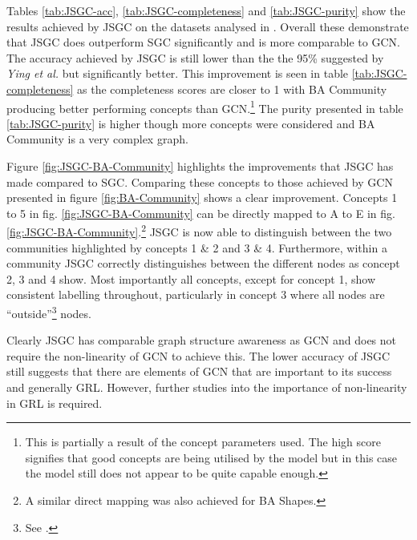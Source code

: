 Tables \ref{tab:JSGC-acc}, \ref{tab:JSGC-completeness} and \ref{tab:JSGC-purity} show the results achieved by JSGC on the datasets analysed in .
Overall these demonstrate that JSGC does outperform SGC significantly and is more comparable to GCN.
The accuracy achieved by JSGC is still lower than the the 95\% suggested by \textit{Ying et al.}\cite{ying2019gnnexplainer} but significantly better.
This improvement is seen in table \ref{tab:JSGC-completeness} as the completeness scores are closer to 1 with BA Community producing better performing concepts than GCN.\footnote{This is partially a result of the concept parameters used. The high score signifies that good concepts are being utilised by the model but in this case the model still does not appear to be quite capable enough.}
The purity presented in table \ref{tab:JSGC-purity} is higher though more concepts were considered and BA Community is a very complex graph.


Figure \ref{fig:JSGC-BA-Community} highlights the improvements that JSGC has made compared to SGC.
Comparing these concepts to those achieved by GCN presented in figure \ref{fig:BA-Community} shows a clear improvement.
Concepts 1 to 5 in fig. \ref{fig:JSGC-BA-Community} can be directly mapped to A to E in fig. \ref{fig:JSGC-BA-Community}.\footnote{A similar direct mapping was also achieved for BA Shapes.}
JSGC is now able to distinguish between the two communities highlighted by concepts 1 \& 2 and 3 \& 4.
Furthermore, within a community JSGC correctly distinguishes between the different nodes as concept 2, 3 and 4 show.
Most importantly all concepts, except for concept 1, show consistent labelling throughout, particularly in concept 3 where all nodes are ``outside''\footnote{See .} nodes.

Clearly JSGC has comparable graph structure awareness as GCN and does not require the non-linearity of GCN to achieve this.
The lower accuracy of JSGC still suggests that there are elements of GCN that are important to its success and generally GRL.
However, further studies into the importance of non-linearity in GRL is required.
